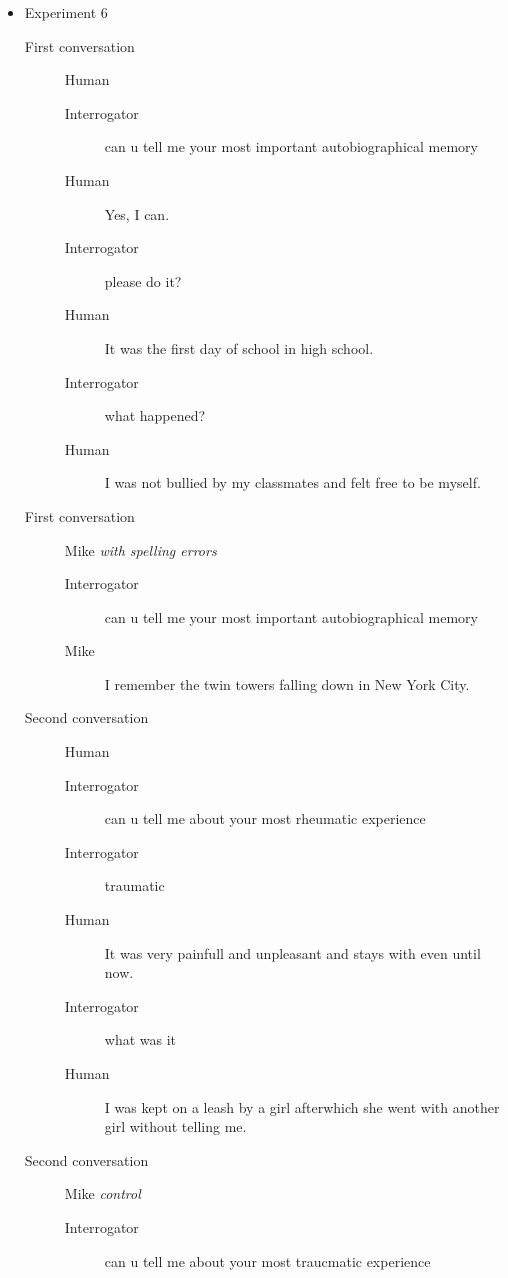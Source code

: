 \begin{itemize}
   \item Experiment 6
      \begin{description}
         \item [First conversation] Human
            \begin{description}
               \item [Interrogator] can u tell me your most important autobiographical memory
               \item [Human] Yes, I can.
               \item [Interrogator] please do it?
               \item [Human] It was the first day of school in high school.
               \item [Interrogator] what happened?
               \item [Human] I was not bullied by my classmates and felt free to be myself.
            \end{description}
         \item [First conversation] Mike \textit{with spelling errors}
            \begin{description}
               \item [Interrogator] can u tell me your most important autobiographical memory
               \item [Mike] I remember the twin towers falling down in New York City.
            \end{description}
         \item [Second conversation] Human
            \begin{description}
               \item [Interrogator] can u tell me about your most rheumatic experience
               \item [Interrogator] traumatic
               \item [Human] It was very painfull and unpleasant and stays with even until now.
               \item [Interrogator] what was it
               \item [Human] I was kept on a leash by a girl afterwhich she went with another girl without telling me.
            \end{description}
         \item [Second conversation] Mike \textit{control}
            \begin{description}
               \item [Interrogator] can u tell me about your most traucmatic experience

\end{description}
\end{description}
\end{itemize}
